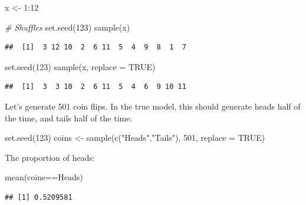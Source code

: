 \documentclass[
]{book}
\newenvironment{Shaded}{\begin{snugshade}}{\end{snugshade}}
\newcommand{\AttributeTok}[1]{\textcolor[rgb]{0.77,0.63,0.00}{#1}}
\newcommand{\CommentTok}[1]{\textcolor[rgb]{0.56,0.35,0.01}{\textit{#1}}}
\newcommand{\ConstantTok}[1]{\textcolor[rgb]{0.00,0.00,0.00}{#1}}
\newcommand{\DecValTok}[1]{\textcolor[rgb]{0.00,0.00,0.81}{#1}}
\newcommand{\FunctionTok}[1]{\textcolor[rgb]{0.00,0.00,0.00}{#1}}
\newcommand{\NormalTok}[1]{#1}
\newcommand{\OtherTok}[1]{\textcolor[rgb]{0.56,0.35,0.01}{#1}}
\newcommand{\SpecialCharTok}[1]{\textcolor[rgb]{0.00,0.00,0.00}{#1}}
\newcommand{\StringTok}[1]{\textcolor[rgb]{0.31,0.60,0.02}{#1}}
\begin{document}
\begin{Shaded}
\begin{Highlighting}[]
\NormalTok{x }\OtherTok{\textless{}{-}} \DecValTok{1}\SpecialCharTok{:}\DecValTok{12}

\CommentTok{\# Shuffles}
\FunctionTok{set.seed}\NormalTok{(}\DecValTok{123}\NormalTok{)}
\FunctionTok{sample}\NormalTok{(x)}
\end{Highlighting}
\end{Shaded}

\begin{verbatim}
##  [1]  3 12 10  2  6 11  5  4  9  8  1  7
\end{verbatim}

\begin{Shaded}
\begin{Highlighting}[]
\FunctionTok{set.seed}\NormalTok{(}\DecValTok{123}\NormalTok{)}
\FunctionTok{sample}\NormalTok{(x, }\AttributeTok{replace =} \ConstantTok{TRUE}\NormalTok{)}
\end{Highlighting}
\end{Shaded}

\begin{verbatim}
##  [1]  3  3 10  2  6 11  5  4  6  9 10 11
\end{verbatim}

Let's generate 501 coin flips. In the true model, this should generate heads half of the time, and tails half of the time.

\begin{Shaded}
\begin{Highlighting}[]
\FunctionTok{set.seed}\NormalTok{(}\DecValTok{123}\NormalTok{)}
\NormalTok{coins }\OtherTok{\textless{}{-}} \FunctionTok{sample}\NormalTok{(}\FunctionTok{c}\NormalTok{(}\StringTok{"Heads"}\NormalTok{,}\StringTok{"Tails"}\NormalTok{), }\DecValTok{501}\NormalTok{, }\AttributeTok{replace =} \ConstantTok{TRUE}\NormalTok{)}
\end{Highlighting}
\end{Shaded}

The proportion of heads:

\begin{Shaded}
\begin{Highlighting}[]
\FunctionTok{mean}\NormalTok{(coins}\SpecialCharTok{==}\StringTok{\textquotesingle{}Heads\textquotesingle{}}\NormalTok{)}
\end{Highlighting}
\end{Shaded}

\begin{verbatim}
## [1] 0.5209581
\end{verbatim}
\end{document}
